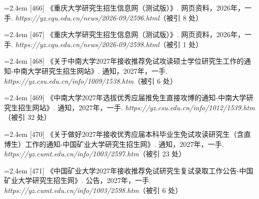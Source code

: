 {\vspace{0.6pt}
\vspace{3.5pt}\par
\nopagebreak\vspace{1pt}
\noindent\hangindent=2.4em \label{src:S0618}{\color{cAccent}[466]} 《重庆大学研究生招生信息网（测试版）》. 网页资料，2026年，一手. \textit{https://yz.cqu.edu.cn/news/2026-09/2596.html}（被引 8 处）\par
\vspace{0.6pt}
\noindent\hangindent=2.4em \label{src:S0619}{\color{cAccent}[467]} 《重庆大学研究生招生信息网（测试版）》. 网页资料，2026年，一手. \textit{https://yz.cqu.edu.cn/news/2026-09/2598.html}（被引 1 处）\par
\vspace{0.6pt}
\vspace{3.5pt}\par
\nopagebreak\vspace{1pt}
\noindent\hangindent=2.4em \label{src:S0624}{\color{cAccent}[468]} 《关于中南大学2027年接收推荐免试攻读硕士学位研究生工作的通知-中南大学研究生招生网站》. 通知，2027年，一手. \textit{https://yz.csu.edu.cn/info/1009/1538.htm}（被引 6 处）\par
\vspace{0.6pt}
\noindent\hangindent=2.4em \label{src:S0625}{\color{cAccent}[469]} 《中南大学2027年选拔优秀应届推免生直接攻博的通知-中南大学研究生招生网站》. 通知，2027年，一手. \textit{https://yz.csu.edu.cn/info/1012/1539.htm}（被引 32 处）\par
\vspace{0.6pt}
\vspace{3.5pt}\par
\nopagebreak\vspace{1pt}
\noindent\hangindent=2.4em \label{src:S0626}{\color{cAccent}[470]} 《关于做好2027年接收优秀应届本科毕业生免试攻读研究生（含直博生）工作的通知-中国矿业大学研究生招生网》. 通知，2027年，一手. \textit{https://yz.cumt.edu.cn/info/1003/2597.htm}（被引 23 处）\par
\vspace{0.6pt}
\noindent\hangindent=2.4em \label{src:S0627}{\color{cAccent}[471]} 《中国矿业大学2027年接收推荐免试研究生复试录取工作公告-中国矿业大学研究生招生网》. 公告，2027年，一手. \textit{https://yz.cumt.edu.cn/info/1003/2598.htm}（被引 6 处）\par
}
